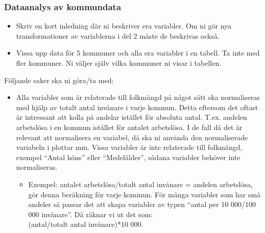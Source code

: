 \documentclass[swedish,english]{article}\usepackage[]{graphicx}\usepackage[]{xcolor}
\begin{document}
\subsubsection{Dataanalys av kommundata}
\begin{itemize}
\item Skriv en kort inledning där ni beskriver era variabler. Om ni gör
nya transformationer av variablerna i del 2 måste de beskrivas också.
\item Vissa upp data för 5 kommuner och alla era variabler i en tabell.
Ta inte med fler kommuner. Ni väljer själv vilka kommuner ni visar
i tabellen.
\end{itemize}
Följande saker ska ni göra/ta med:
\begin{itemize}
\item Alla variabler som är relaterade till folkmängd på något sätt ska
normaliseras med hjälp av totalt antal invånare i varje kommun. Detta
eftersom det oftast är intressant att kolla på andelar istället för
absoluta antal. T.ex. andelen arbetslösa i en kommun istället för
antalet arbetslösa. I de fall då det är relevant att normalisera en
variabel, då ska ni använda den normaliserade variabeln i plottar
mm. Vissa variabler är inte relaterade till folkmängd, exempel “Antal
höns” eller “Medelålder”, sådana variabler behöver inte normaliseras. 
\begin{itemize}
\item Exempel: antalet arbetslösa/totalt antal invånare = andelen arbetslösa,
gör denna beräkning för varje kommun. För många variabler som har
små andeler så passar det att skapa variabler av typen “antal per
10 000/100 000 invånare”. Då räknar vi ut det som: \\
(antal/totalt antal invånare){*}10 000.
\end{itemize}
\end{itemize}
\end{document}
